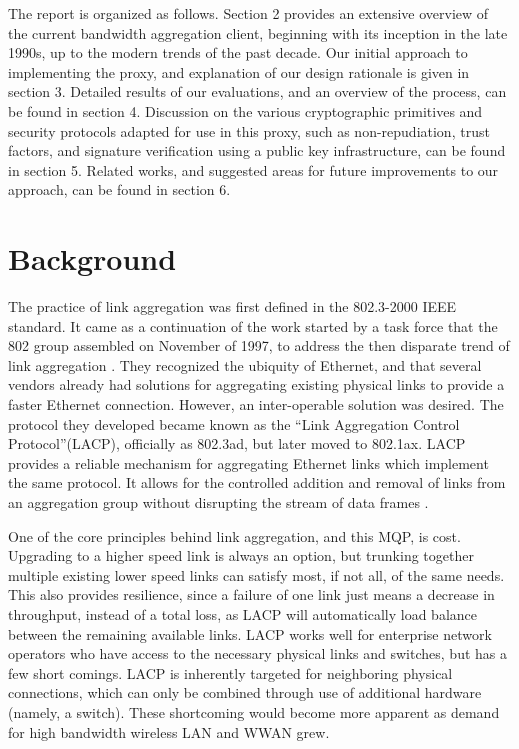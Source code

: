 \documentclass[12pt]{article}
\begin{document}
	The report is organized as follows. Section 2 provides an extensive overview of the current bandwidth aggregation client, beginning with its inception in the late 1990s, up to the modern trends of the past decade. Our initial approach to implementing the proxy, and explanation of our design rationale is given in section 3. Detailed results of our evaluations, and an overview of the process, can be found in section 4. Discussion on the various cryptographic primitives and security protocols adapted for use in this proxy, such as non-repudiation, trust factors, and signature verification using a public key infrastructure, can be found in section 5. Related works, and suggested areas for future improvements to our approach, can be found in section 6.




\newpage
\section{Background}

	The practice of link aggregation was first defined in the 802.3-2000 IEEE standard. It came as a continuation of the work started by a task force that the 802 group assembled on November of 1997, to address the then disparate trend of link aggregation \cite{trunkingTutorial}. They recognized the ubiquity of Ethernet, and that several vendors already had solutions for aggregating existing physical links to provide a faster Ethernet connection. However, an inter-operable solution was desired. The protocol they developed became known as the ``Link Aggregation Control Protocol''(LACP), officially as 802.3ad, but later moved to 802.1ax. LACP provides a reliable mechanism for aggregating Ethernet links which implement the same protocol. It allows for the controlled addition and removal of links from an aggregation group without disrupting the stream of data frames \cite{IEEE_IBM}.

	One of the core principles behind link aggregation, and this MQP, is cost. Upgrading to a higher speed link is always an option, but trunking together multiple existing lower speed links can satisfy most, if not all, of the same needs. This also provides resilience, since a failure of one link just means a decrease in throughput, instead of a total loss, as LACP will automatically load balance between the remaining available links. LACP works well for enterprise network operators who have access to the necessary physical links and switches, but has a few short comings. LACP is inherently targeted for neighboring physical connections, which can only be combined through use of additional hardware (namely, a switch). These shortcoming would become more apparent as demand for high bandwidth wireless LAN and WWAN grew.
\end{document}
